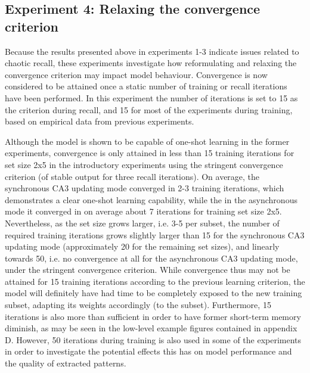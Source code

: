 \subsection{Experiment 4: Relaxing the convergence criterion}\label{sect:relaxed-criterion}

Because the results presented above in experiments 1-3 indicate issues related to chaotic recall, these experiments investigate how reformulating and relaxing the convergence criterion may impact model behaviour. Convergence is now considered to be attained once a static number of training or recall iterations have been performed. In this experiment the number of iterations is set to 15 as the criterion during recall, and 15 for most of the experiments during training, based on empirical data from previous experiments.

Although the model is shown to be capable of one-shot learning in the former experiments, convergence is only attained in less than 15 training iterations for set size 2x5 in the introductory experiments using the stringent convergence criterion (of stable output for three recall iterations). On average, the synchronous CA3 updating mode converged in 2-3 training iterations, which demonstrates a clear one-shot learning capability, while the in the asynchronous mode it converged in on average about 7 iterations for training set size 2x5. 
Nevertheless, as the set size grows larger, i.e. 3-5 per subset, the number of required training iterations grows slightly larger than 15 for the synchronous CA3 updating mode (approximately 20 for the remaining set sizes), and linearly towards 50, i.e. no convergence at all for the asynchronous CA3 updating mode, under the stringent convergence criterion.
While convergence thus may not be attained for 15 training iterations according to the previous learning criterion, the model will definitely have had time to be completely exposed to the new training subset, adapting its weights accordingly (to the subset). Furthermore, 15 iterations is also more than sufficient in order to have former short-term memory diminish, as may be seen in the low-level example figures contained in appendix D.
However, 50 iterations during training is also used in some of the experiments in order to investigate the potential effects this has on model performance and the quality of extracted patterns.

